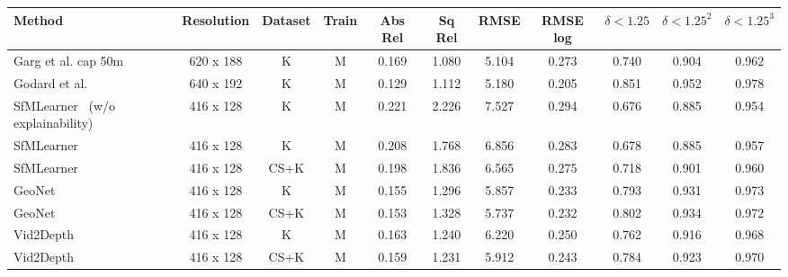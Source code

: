 \documentclass[letterpaper, 10 pt, conference]{ieeeconf}  \IEEEoverridecommandlockouts
\begin{document}
\begin{table*}[h]
\centering
{
\small
\setlength{\tabcolsep}{0.3em}
\begin{tabular}{lcccccccccc}
\toprule
\textbf{Method} &
Resolution & 
Dataset &
Train &
Abs Rel &
Sq Rel &
RMSE &
RMSE log &
$\delta < 1.25$ &
$\delta < 1.25^2$ &
$\delta < 1.25^3$\vspace{0.5mm}\\
\midrule
Garg et al.\cite{garg2016unsupervised} cap 50m & 620 x 188 & K & M & 0.169 & 1.080 &
5.104 & 0.273 & 0.740 & 0.904 & 0.962\\

Godard et al.~\cite{godard2018digging} & 640 x 192 & K & M & 0.129 & 1.112 & 5.180 & 0.205 & 0.851 & 0.952 & 0.978\\

SfMLearner~\cite{zhou2017unsupervised} (w/o explainability) & 416 x 128 & K & M
& 
0.221 & 2.226 & 7.527 & 0.294 & 0.676 & 0.885 & 0.954\\
SfMLearner~\cite{zhou2017unsupervised} & 416 x 128 & K & M & 0.208 & 1.768 & 6.856 & 0.283 & 0.678 & 0.885 & 0.957\\
SfMLearner~\cite{zhou2017unsupervised} & 416 x 128 & CS+K & M & 0.198 & 1.836 & 6.565 & 0.275 & 0.718 & 0.901 & 0.960\\
GeoNet~\cite{yin2018geonet} & 416 x 128 & K & M & 0.155 & 1.296 & 5.857 & 0.233 & 0.793 & 0.931 & 0.973 \\
GeoNet~\cite{yin2018geonet} & 416 x 128 & CS+K & M & 0.153 & 1.328 & 5.737 & 0.232 & 0.802 & 0.934 & 0.972 \\
Vid2Depth~\cite{mahjourian2018unsupervised} & 416 x 128 & K & M & 0.163 & 1.240 & 6.220 & 0.250 & 0.762 & 0.916 & 0.968 \\
Vid2Depth~\cite{mahjourian2018unsupervised} & 416 x 128 & CS+K & M & 0.159 & 1.231 & 5.912 & 0.243 & 0.784 & 0.923 & 0.970 \\



\end{tabular}}
\end{table*}
\end{document}
